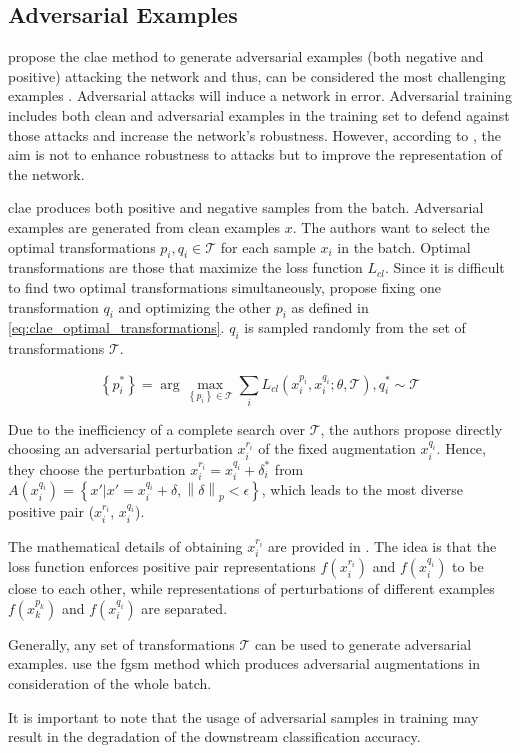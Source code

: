 \subsection{Adversarial Examples}\label{subsec:adversarial_examples}

\citeauthor{ho_contrastive_2020} propose the \ac{clae} method to generate adversarial examples 
(both negative and positive) attacking the network and thus,
can be considered the most challenging examples \cite{ho_contrastive_2020}.
Adversarial attacks will induce a network in error.
Adversarial training includes both clean and adversarial examples in the training set to defend against those attacks and 
increase the network's robustness.
However, according to \citeauthor{ho_contrastive_2020}, the aim is not to enhance robustness to attacks 
but to improve the representation of the network.

\ac{clae} produces both positive and negative samples from the batch.
Adversarial examples are generated from clean examples $x$.
The authors want to select the optimal transformations $p_i, q_i \in \mathcal{T}$ for each sample $x_i$ in the batch.
Optimal transformations are those that maximize the loss function $L_{cl}$.
Since it is difficult to find two optimal transformations simultaneously, 
\citeauthor{ho_contrastive_2020} propose fixing one transformation $q_i$ and 
optimizing the other $p_i$ as defined in \eqref{eq:clae_optimal_transformations}.
$q_i$ is sampled randomly from the set of transformations $\mathcal{T}$.

\begin{equation}
    \left\{p^*_i\right\} = \arg\max_{\left\{p_i\right\} \in \mathcal{T}} \sum_{i}^{}L_{cl}(x_i^{p_i}, x_i^{q_i}; \theta, \mathcal{T}), q^*_i \sim \mathcal{T}
    \label{eq:clae_optimal_transformations}
\end{equation}

Due to the inefficiency of a complete search over $\mathcal{T}$, 
the authors propose directly choosing an adversarial perturbation $x^{r_i}_i$ of the fixed augmentation $x_i^{q_i}$.
Hence, they choose the perturbation $x^{r_i}_i = x^{q_i}_i + \delta^*_i$ from 
$A(x^{q_i}_i) = \left\{x' | x' = x^{q_i}_i + \delta, \left\|\delta\right\|_p < \epsilon\right\}$,
which leads to the most diverse positive pair ($x^{r_i}_i$, $x^{q_i}_i$).

The mathematical details of obtaining $x^{r_i}_i$ are provided in \citet{ho_contrastive_2020}.
The idea is that the loss function enforces 
positive pair representations $f(x^{r_i}_i)$ and $f(x^{q_i}_i)$ to be close to each other,
while representations of perturbations of different examples $f(x^{p_k}_k)$ and $f(x^{q_i}_i)$ are separated.

Generally, any set of transformations $\mathcal{T}$ can be used to generate adversarial examples.
\citeauthor{ho_contrastive_2020} use the \ac{fgsm} method which 
produces adversarial augmentations in consideration of the whole batch.

It is important to note that the usage of adversarial samples in training may result in 
the degradation of the downstream classification accuracy.